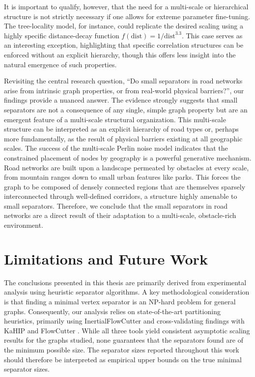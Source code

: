 It is important to qualify, however, that the need for a multi-scale or hierarchical structure is not strictly necessary if one allows for extreme parameter fine-tuning.
The tree-locality model, for instance, could replicate the desired scaling using a highly specific distance-decay function \(f(\text{dist}) = 1/\text{dist}^{3.3}\).
This case serves as an interesting exception, highlighting that specific correlation structures can be enforced without an explicit hierarchy, though this offers less insight into the natural emergence of such properties.

Revisiting the central research question, \enquote{Do small separators in road networks arise from intrinsic graph properties, or from real-world physical barriers?}, our findings provide a nuanced answer.
The evidence strongly suggests that small separators are not a consequence of any single, simple graph property but are an emergent feature of a multi-scale structural organization.
This multi-scale structure can be interpreted as an explicit hierarchy of road types or, perhaps more fundamentally, as the result of physical barriers existing at all geographic scales.
The success of the multi-scale Perlin noise model indicates that the constrained placement of nodes by geography is a powerful generative mechanism.
Road networks are built upon a landscape permeated by obstacles at every scale, from mountain ranges down to small urban features like parks.
This forces the graph to be composed of densely connected regions that are themselves sparsely interconnected through well-defined corridors, a structure highly amenable to small separators.
Therefore, we conclude that the small separators in road networks are a direct result of their adaptation to a multi-scale, obstacle-rich environment.

\section{Limitations and Future Work}
\label{sec:conclusion:future_work}

The conclusions presented in this thesis are primarily derived from experimental analysis using heuristic separator algorithms.
A key methodological consideration is that finding a minimal vertex separator is an NP-hard problem for general graphs.
Consequently, our analysis relies on state-of-the-art partitioning heuristics, primarily using InertialFlowCutter \cite{gottesburen_faster_2019} and cross-validating findings with KaHIP \cite{sanders_think_2013} and FlowCutter \cite{hamann_graph_2018}.
While all three tools yield consistent asymptotic scaling results for the graphs studied, none guarantees that the separators found are of the minimum possible size.
The separator sizes reported throughout this work should therefore be interpreted as empirical upper bounds on the true minimal separator sizes.


